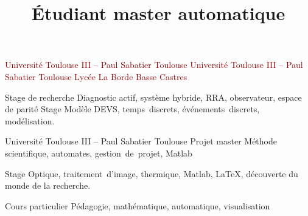 \documentclass[11pt,a4paper,sans]{moderncv}        %
\title{\huge Étudiant master automatique} %
\begin{document}
\begin{samepage}
\makecvtitle
\vspace{-1cm}
\noindent\begin{minipage}[t]{.44\textwidth}
{\textcolor{darkred}{Université Toulouse III -- Paul Sabatier}}
{\textcolor{darkred}{Toulouse}}%
%
{\textcolor{darkred}{Université Toulouse III -- Paul Sabatier}}
{\textcolor{darkred}{Toulouse}}%
%
{\textcolor{darkred}{Lycée La Borde Basse}}
{\textcolor{darkred}{Castres}}%
\end{minipage}\hfill%
\noindent\begin{minipage}[t]{.51\textwidth}
%
{Stage de recherche}
{Diagnostic actif, système hybride, RRA, observateur, espace de parité}
%
{Stage}%
{Modèle DEVS, temps~discrets, événements~discrets, modélisation.}


%
{Université Toulouse III -- Paul Sabatier}
{Toulouse}%
{Projet master}%
{Méthode scientifique, automates, gestion~de~projet, Matlab}

%
{Stage}%
{Optique, traitement~d’image, thermique, Matlab, \LaTeX, découverte du monde de la recherche.}

%
{Cours particulier}
{Pédagogie, mathématique, automatique, visualisation}
\end{minipage}




\end{samepage}
\end{document}
